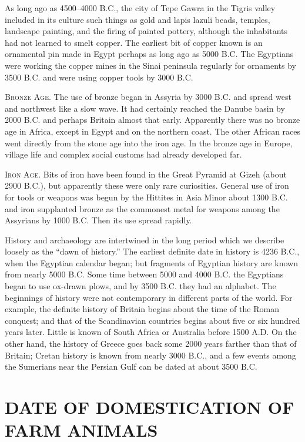 As long ago as 4500--4000 B.C., the city of Tepe Gawra in the Tigris valley included in its culture such things
as gold and lapis lazuli beads, temples, landscape painting, and the firing of painted pottery, although the
inhabitants had not learned to smelt copper. The earliest bit of copper known is an ornamental pin made in Egypt
perhaps as long ago as 5000 B.C. The Egyptians were working the copper mines in the Sinai peninsula regularly for
ornaments by 3500 B.C. and were using copper tools by 3000 B.C.

\textsc{Bronze Age}. The use of bronze began in Assyria by 3000 B.C. and spread west and northwest like a slow
wave. It had certainly reached the Danube basin by 2000 B.C. and perhaps Britain almost that early. Apparently
there was no bronze age in Africa, except in Egypt and on the northern coast. The other African races went
directly from the stone age into the iron age. In the bronze age in Europe, village life and complex social
customs had already developed far.

\textsc{Iron Age}. Bits of iron have been found in the Great Pyramid at Gizeh (about 2900 B.C.), but apparently
these were only rare curiosities. General use of iron for tools or weapons was begun by the Hittites in Asia
Minor about 1300 B.C. and iron supplanted bronze as the commonest metal for weapons among the Assyrians by 1000
B.C. Then its use spread rapidly.

History and archaeology are intertwined in the long period which we describe loosely as the ``dawn of history.''
The earliest definite date in history is 4236 B.C., when the Egyptian calendar began; but fragments of Egyptian
history are known from nearly 5000 B.C. Some time between 5000 and 4000 B.C. the Egyptians began to use ox-drawn
plows, and by 3500 B.C. they had an alphabet. The beginnings of history were not contemporary in different parts
of the world. For example, the definite history of Britain begins about the time of the Roman conquest; and that
of the Scandinavian countries begins about five or six hundred years later. Little is known of South Africa or
Australia before 1500 A.D. On the other hand, the history of Greece goes back some 2000 years farther than that
of Britain; Cretan history is known from nearly 3000 B.C., and a few events among the Sumerians near the Persian
Gulf can be dated at about 3500 B.C.

\section*{DATE OF DOMESTICATION OF FARM ANIMALS}

